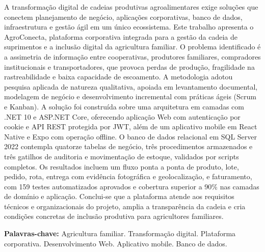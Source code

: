 A transformação digital de cadeias produtivas agroalimentares exige soluções que
conectem planejamento de negócio, aplicações corporativas, banco de dados,
infraestrutura e gestão ágil em um único ecossistema. Este trabalho apresenta o
AgroConecta, plataforma corporativa integrada para a gestão da cadeia de
suprimentos e a inclusão digital da agricultura familiar. O problema identificado
é a assimetria de informação entre cooperativas, produtores familiares,
compradores institucionais e transportadores, que provoca perdas de produção,
fragilidade na rastreabilidade e baixa capacidade de escoamento. A metodologia
adotou pesquisa aplicada de natureza qualitativa, apoiada em levantamento
documental, modelagem de negócio e desenvolvimento incremental com práticas ágeis
(Scrum e Kanban). A solução foi construída sobre uma arquitetura em camadas com
.NET 10 e ASP.NET Core, oferecendo aplicação Web com autenticação por cookie e
API REST protegida por JWT, além de um aplicativo mobile em React Native e Expo
com operação offline. O banco de dados relacional em SQL Server 2022 contempla
quatorze tabelas de negócio, três procedimentos armazenados e três gatilhos de
auditoria e movimentação de estoque, validados por scripts completos. Os
resultados incluem um fluxo ponta a ponta de produto, lote, pedido, rota, entrega
com evidência fotográfica e geolocalização, e faturamento, com 159 testes
automatizados aprovados e cobertura superior a 90\% nas camadas de domínio e
aplicação. Conclui-se que a plataforma atende aos requisitos técnicos e
organizacionais do projeto, amplia a transparência da cadeia e cria condições
concretas de inclusão produtiva para agricultores familiares.

\vspace{0.5\baselineskip}
\noindent\textbf{Palavras-chave:} Agricultura familiar. Transformação digital.
Plataforma corporativa. Desenvolvimento Web. Aplicativo mobile. Banco de dados.
\endgroup

